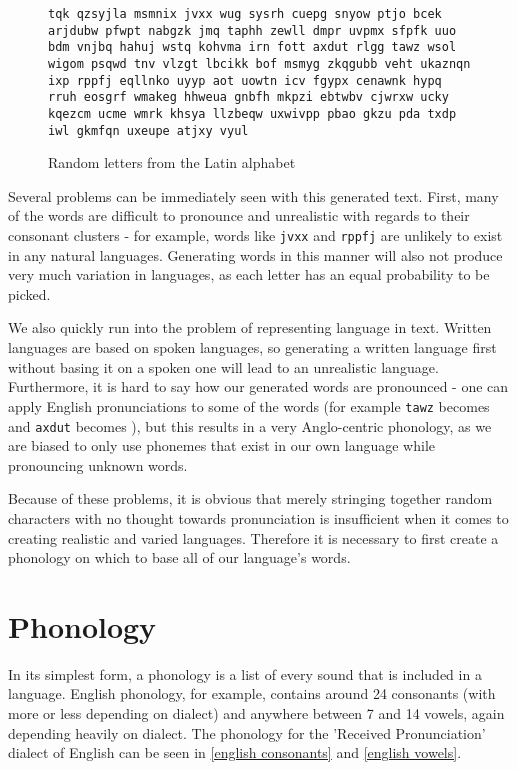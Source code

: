 \documentclass{report}
\begin{document}
   \begin{figure}[h]
   \caption{Random letters from the Latin alphabet}
   \label{random letters from latin alphabet}  
   \begin{tcolorbox}
\texttt{tqk qzsyjla msmnix jvxx wug sysrh cuepg snyow ptjo bcek arjdubw pfwpt nabgzk jmq taphh zewll dmpr uvpmx sfpfk uuo bdm vnjbq hahuj wstq kohvma irn fott axdut rlgg tawz wsol wigom psqwd tnv vlzgt lbcikk bof msmyg zkqgubb veht ukaznqn ixp rppfj eqllnko uyyp aot uowtn icv fgypx cenawnk hypq rruh eosgrf wmakeg hhweua gnbfh mkpzi ebtwbv cjwrxw ucky kqezcm ucme wmrk khsya llzbeqw uxwivpp pbao gkzu pda txdp iwl gkmfqn uxeupe atjxy vyul}
   \end{tcolorbox}
\end{figure}
   
   Several problems can be immediately seen with this generated text. First, many of the words are difficult to pronounce and unrealistic with regards to their consonant clusters - for example, words like \verb|jvxx| and \verb|rppfj| are unlikely to exist in any natural languages. Generating words in this manner will also not produce very much variation in languages, as each letter has an equal probability to be picked.
   
   We also quickly run into the problem of representing language in text. Written languages are based on spoken languages, so generating a written language first without basing it on a spoken one will lead to an unrealistic language. Furthermore, it is hard to say how our generated words are pronounced - one can apply English pronunciations to some of the words (for example \verb|tawz| becomes  and \verb|axdut| becomes ), but this results in a very Anglo-centric phonology, as we are biased to only use phonemes that exist in our own language while pronouncing unknown words.
   
   Because of these problems, it is obvious that merely stringing together random characters with no thought towards pronunciation is insufficient when it comes to creating realistic and varied languages. Therefore it is necessary to first create a phonology on which to base all of our language's words.
   
   \section{Phonology}
   
   In its simplest form, a phonology is a list of every sound that is included in a language. English phonology, for example, contains around 24 consonants (with more or less depending on dialect) and anywhere between 7 and 14 vowels, again depending heavily on dialect. The phonology for the 'Received Pronunciation' dialect of English can be seen in \ref{english consonants} and \ref{english vowels}.
   
\end{document}
